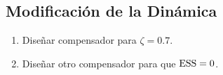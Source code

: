 \subsection{Modificación de la Dinámica}
\begin{enumerate}[label=3.\arabic*.]
	\item Diseñar compensador para $\zeta = 0.7$.
	\item Diseñar otro compensador para que $\mathrm{ESS} = 0$.
\end{enumerate}
